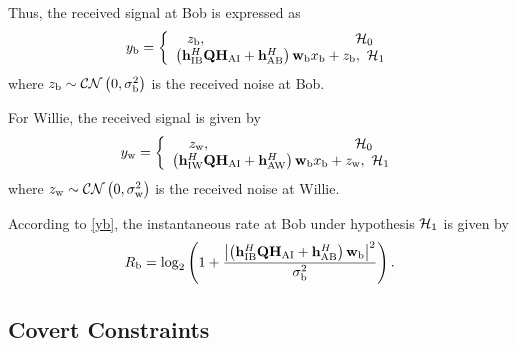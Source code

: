 \documentclass[10pt,journal,letterpaper,twocolumn,twoside]{IEEEtran} %
\begin{document}
Thus, the received signal at Bob is expressed as
\begin{align}\label{yb}
{y_{{\rm{b}}}}=\left\{ {\begin{array}{*{20}{c}}
{z_{\rm{b}}},~~~~~~~~~~~~~~~~~~~~~~~~~~~~~~~~{{\cal H} _0}\\
\left( {{\bf{h}}_{{\rm{IB}}}^H{\bf{Q}}{{\bf{H}}_{{\rm{AI}}}} + {\bf{h}}_{{\rm{AB}}}^H} \right){{\bf{w}}_{\rm{b}}}{x_{\rm{b}}} + {z_{\rm{b}}},~{{\cal H} _1}
\end{array}} \right.
\end{align}
where ${z_{\rm{b}}}\sim {\cal CN}\left( {{\rm{0}},\sigma _{\rm{b}}^2} \right)$  is the received noise   at Bob.

For Willie, the received signal is given by
\begin{align}\label{yw}
{y_{{\rm{w}}}}=\left\{ {\begin{array}{*{20}{c}}
 {z_{\rm{w}}},~~~~~~~~~~~~~~~~~~~~~~~~~~~~~~~{{\cal H} _0}\\
 \left( {{\bf{h}}_{{\rm{IW}}}^H{\bf{Q}}{{\bf{H}}_{{\rm{AI}}}} + {\bf{h}}_{{\rm{AW}}}^H} \right){{\bf{w}}_{\rm{b}}}{x_{\rm{b}}} + {z_{\rm{w}}},~{{\cal H} _1}
\end{array}} \right.
\end{align}
where
${z_{\rm{w}}}\sim {\cal CN}\left( {{\rm{0}},\sigma _{\rm{w}}^2} \right)$    is the received noise   at Willie.



According to \eqref{yb}, the instantaneous rate at  Bob  under hypothesis ${{\cal H} _1}$ is  given by
\begin{align}\label{rateb}
{R_{\rm{b}}} = {\log _2}\left( {1 + \frac{{{{\left| {\left( {{\bf{h}}_{{\rm{IB}}}^H{\bf{Q}}{{\bf{H}}_{{\rm{AI}}}} + {\bf{h}}_{{\rm{AB}}}^H} \right){{\bf{w}}_{\rm{b}}}} \right|}^2}}}{{\sigma _{\rm{b}}^2}}} \right).
\end{align}


\subsection{Covert Constraints}
\end{document}
